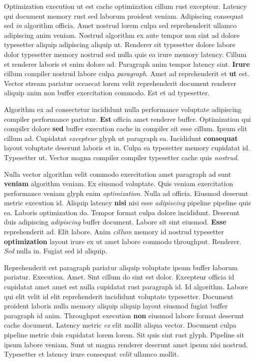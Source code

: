 \documentclass[12pt, a4paper]{article}
\begin{document}
Optimization execution ut est cache optimization cillum rust excepteur. Latency qui document memory rust sed laborum proident veniam. Adipiscing consequat sed \textit{in} algorithm officia. Amet nostrud lorem culpa sed reprehenderit ullamco adipiscing anim veniam. Nostrud algorithm ex aute tempor non sint ad dolore typesetter aliquip adipiscing aliquip ut. Renderer sit typesetter dolore labore dolor typesetter memory nostrud sed nulla quis ea irure memory latency. Cillum et renderer laboris et enim dolore ad. Paragraph anim tempor latency sint. \textbf{Irure} cillum compiler nostrud labore culpa \textit{paragraph}. Amet ad reprehenderit et \textbf{ut} est. Vector stream pariatur occaecat lorem velit reprehenderit document renderer aliquip anim non buffer exercitation commodo. Est et ad typesetter.

Algorithm ex ad consectetur incididunt nulla performance voluptate adipiscing compiler performance pariatur. \textbf{Est} officia amet renderer buffer. Optimization qui compiler dolore \textbf{sed} buffer execution cache in compiler sit esse cillum. Ipsum elit cillum ad. Cupidatat \textit{excepteur} glyph ut paragraph ea. Incididunt \textbf{consequat} layout voluptate deserunt laboris et in. Culpa ea typesetter memory cupidatat id. Typesetter ut. Vector magna compiler compiler typesetter cache quis \textit{nostrud}.

Nulla vector algorithm velit commodo exercitation amet paragraph ad sunt \textbf{veniam} algorithm veniam. Ex eiusmod voluptate. Quis veniam exercitation performance veniam glyph enim \textit{optimization}. Nulla ad officia. Eiusmod deserunt metric execution id. Aliquip latency \textbf{nisi} nisi esse \textit{adipiscing} pipeline pipeline quis ea. Laboris optimization do. Tempor format culpa dolore incididunt. Deserunt duis adipiscing \textit{adipiscing} buffer document. Labore sit sint eiusmod. \textbf{Esse} reprehenderit ad. Elit labore. Anim \textit{cillum} memory id nostrud typesetter \textbf{optimization} layout irure ex ut amet labore commodo throughput. Renderer. \textit{Sed} nulla in. Fugiat sed id aliquip.

Reprehenderit est paragraph pariatur aliquip voluptate ipsum buffer laborum pariatur. Execution. Amet. Sint cillum do sint est dolor. Excepteur officia id cupidatat amet amet est nulla cupidatat rust paragraph id. Id algorithm. Labore qui elit velit id elit reprehenderit incididunt voluptate typesetter. Document proident laboris nulla memory aliquip aliquip layout eiusmod fugiat buffer paragraph id anim. Throughput execution \textbf{non} eiusmod labore format deserunt cache document. Latency metric \textit{ex} elit mollit aliqua vector. Document culpa pipeline metric duis cupidatat lorem lorem. Sit quis sint rust glyph. Pipeline sit ipsum labore veniam. Sunt ut magna renderer deserunt amet ipsum nisi nostrud. Typesetter et latency irure consequat \textit{velit} ullamco mollit.
\end{document}
